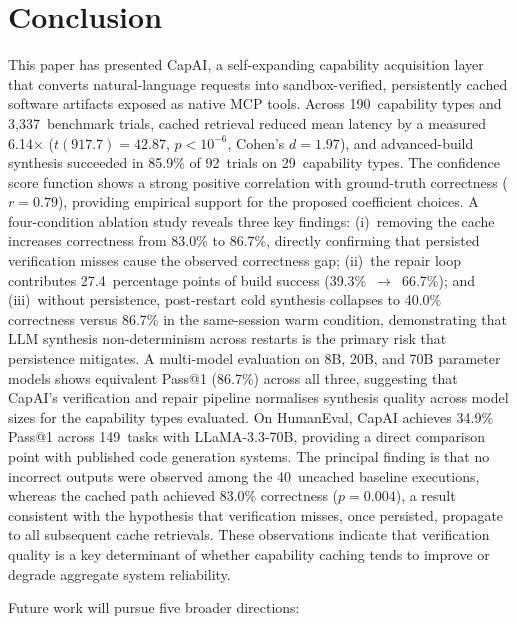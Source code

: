 \documentclass[conference]{IEEEtran}
\begin{document}
\section{Conclusion}
\label{sec:conclusion}

This paper has presented CapAI, a self-expanding capability acquisition
layer that converts natural-language requests into sandbox-verified,
persistently cached software artifacts exposed as native MCP tools.
Across 190~capability types and 3{,}337~benchmark trials, cached retrieval
reduced mean latency by a measured 6.14$\times$
($t(917.7) = 42.87$, $p < 10^{-6}$, Cohen's $d = 1.97$), and
advanced-build synthesis succeeded in 85.9\% of 92~trials on 29~capability
types.
The confidence score function shows a strong positive correlation with
ground-truth correctness ($r = 0.79$), providing empirical support for
the proposed coefficient choices.
A four-condition ablation study reveals three key findings:
(i)~removing the cache increases correctness from 83.0\% to 86.7\%,
directly confirming that persisted verification misses cause the observed
correctness gap;
(ii)~the repair loop contributes 27.4~percentage points of build success
(39.3\%~$\to$~66.7\%); and
(iii)~without persistence, post-restart cold synthesis collapses to 40.0\%
correctness versus 86.7\% in the same-session warm condition,
demonstrating that LLM synthesis non-determinism across restarts is
the primary risk that persistence mitigates.
A multi-model evaluation on 8B, 20B, and 70B parameter models shows
equivalent Pass@1 (86.7\%) across all three, suggesting that CapAI's
verification and repair pipeline normalises synthesis quality across
model sizes for the capability types evaluated.
On HumanEval, CapAI achieves 34.9\% Pass@1 across 149~tasks with
LLaMA-3.3-70B, providing a direct comparison point with published
code generation systems.
The principal finding is that no incorrect outputs were observed among the
40~uncached baseline executions, whereas the cached path achieved 83.0\%
correctness ($p = 0.004$), a result consistent with the hypothesis that
verification misses, once persisted, propagate to all subsequent cache
retrievals.
These observations indicate that verification quality is a key determinant
of whether capability caching tends to improve or degrade aggregate system
reliability.

Future work will pursue five broader directions:
\end{document}

